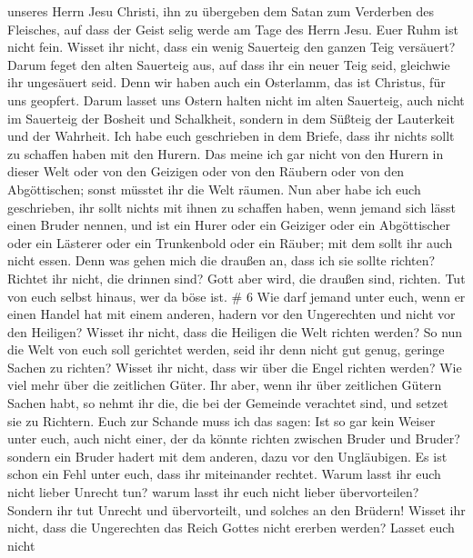 unseres Herrn Jesu Christi,  ihn zu übergeben dem Satan zum
Verderben des Fleisches, auf dass der Geist selig werde am Tage des
Herrn Jesu.  Euer Ruhm ist nicht fein. Wisset ihr nicht,
dass ein wenig Sauerteig den ganzen Teig versäuert?  Darum
feget den alten Sauerteig aus, auf dass ihr ein neuer Teig seid,
gleichwie ihr ungesäuert seid. Denn wir haben auch ein Osterlamm, das
ist Christus, für uns geopfert.  Darum lasset uns Ostern
halten nicht im alten Sauerteig, auch nicht im Sauerteig der Bosheit und
Schalkheit, sondern in dem Süßteig der Lauterkeit und der Wahrheit.
 Ich habe euch geschrieben in dem Briefe, dass ihr nichts
sollt zu schaffen haben mit den Hurern.  Das meine ich gar
nicht von den Hurern in dieser Welt oder von den Geizigen oder von den
Räubern oder von den Abgöttischen; sonst müsstet ihr die Welt räumen.
 Nun aber habe ich euch geschrieben, ihr sollt nichts mit
ihnen zu schaffen haben, wenn jemand sich lässt einen Bruder nennen, und
ist ein Hurer oder ein Geiziger oder ein Abgöttischer oder ein Lästerer
oder ein Trunkenbold oder ein Räuber; mit dem sollt ihr auch nicht
essen.  Denn was gehen mich die draußen an, dass ich sie
sollte richten? Richtet ihr nicht, die drinnen sind?  Gott
aber wird, die draußen sind, richten. Tut von euch selbst hinaus, wer da
böse ist. \# 6  Wie darf jemand unter euch, wenn er einen
Handel hat mit einem anderen, hadern vor den Ungerechten und nicht vor
den Heiligen?  Wisset ihr nicht, dass die Heiligen die Welt
richten werden? So nun die Welt von euch soll gerichtet werden, seid ihr
denn nicht gut genug, geringe Sachen zu richten?  Wisset ihr
nicht, dass wir über die Engel richten werden? Wie viel mehr über die
zeitlichen Güter.  Ihr aber, wenn ihr über zeitlichen Gütern
Sachen habt, so nehmt ihr die, die bei der Gemeinde verachtet sind, und
setzet sie zu Richtern.  Euch zur Schande muss ich das
sagen: Ist so gar kein Weiser unter euch, auch nicht einer, der da
könnte richten zwischen Bruder und Bruder?  sondern ein
Bruder hadert mit dem anderen, dazu vor den Ungläubigen.  Es
ist schon ein Fehl unter euch, dass ihr miteinander rechtet. Warum lasst
ihr euch nicht lieber Unrecht tun? warum lasst ihr euch nicht lieber
übervorteilen?  Sondern ihr tut Unrecht und übervorteilt,
und solches an den Brüdern!  Wisset ihr nicht, dass die
Ungerechten das Reich Gottes nicht ererben werden? Lasset euch nicht
